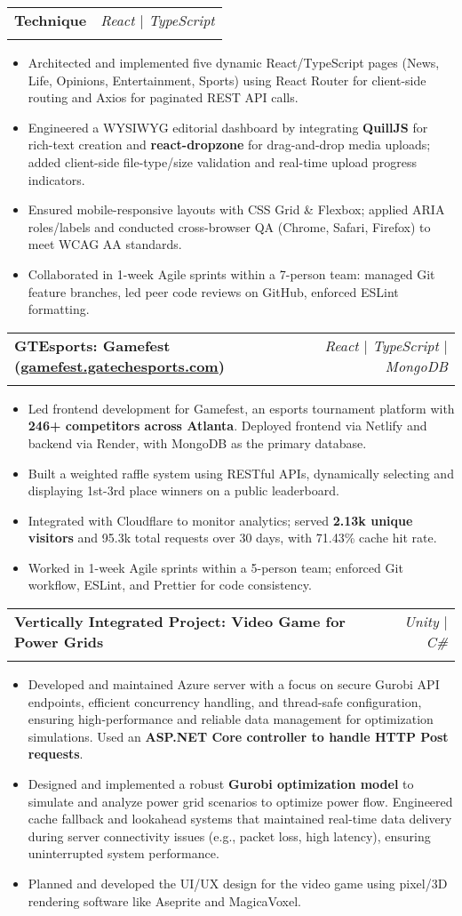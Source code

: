 \documentclass[letterpaper,11pt]{article}
\makeatletter
\newcommand{\resumeItem}[1]{
  \item\small{
    {#1 \vspace{-2pt}}
  }
}
\newcommand{\resumeSubheading}[4]{
  \vspace{-2pt}\item
    \begin{tabular*}{0.97\textwidth}[t]{l@{\extracolsep{\fill}}r}
      \textbf{#1} & #2 \\
      \textit{\small#3} & \textit{\small #4} \\
    \end{tabular*}\vspace{-7pt}
}
\newcommand{\resumeItemListStart}{\begin{itemize}}
\newcommand{\resumeItemListEnd}{\end{itemize}\vspace{-8pt}}
\makeatother
\begin{document}
    \resumeSubheading
    {Technique}{\textit{React $|$ TypeScript}}
    {}{}
    \resumeItemListStart
    \vspace{-5mm}
      \resumeItem{Architected and implemented five dynamic React/TypeScript pages (News, Life, Opinions, Entertainment, Sports) using React Router for client-side routing and Axios for paginated REST API calls.}
      \resumeItem{Engineered a WYSIWYG editorial dashboard by integrating \textbf{QuillJS} for rich-text creation and \textbf{react-dropzone} for drag-and-drop media uploads; added client-side file-type/size validation and real-time upload progress indicators.}
      \resumeItem{Ensured mobile-responsive layouts with CSS Grid \& Flexbox; applied ARIA roles/labels and conducted cross-browser QA (Chrome, Safari, Firefox) to meet WCAG AA standards.}
      \resumeItem{Collaborated in 1-week Agile sprints within a 7-person team: managed Git feature branches, led peer code reviews on GitHub, enforced ESLint formatting.}
    \resumeItemListEnd

    \resumeSubheading
    {GTEsports: Gamefest (\href{https://gamefest.gatechesports.com/home}{\underline{gamefest.gatechesports.com}})}{\textit{React $|$ TypeScript $|$ MongoDB}}
    {}{}
    \resumeItemListStart
    \vspace{-5mm}
      \resumeItem{Led frontend development for Gamefest, an esports tournament platform with \textbf{246+ competitors across Atlanta}. Deployed frontend via Netlify and backend via Render, with MongoDB as the primary database.}
      \resumeItem{Built a weighted raffle system using RESTful APIs, dynamically selecting and displaying 1st-3rd place winners on a public leaderboard.}
      \resumeItem{Integrated with Cloudflare to monitor analytics; served \textbf{2.13k unique visitors} and 95.3k total requests over 30 days, with 71.43\% cache hit rate.}
      \resumeItem{Worked in 1-week Agile sprints within a 5-person team; enforced Git workflow, ESLint, and Prettier for code consistency.}
    \resumeItemListEnd    

    \resumeSubheading
      {Vertically Integrated Project: Video Game for Power Grids}{\textit{Unity $|$ C\#}}
      {}{}
      \resumeItemListStart
      \vspace{-5mm}
        \resumeItem{Developed and maintained Azure server with a focus on secure Gurobi API endpoints, efficient concurrency handling, and thread-safe configuration, ensuring high-performance and reliable data management for optimization simulations. Used an \textbf{ASP.NET Core controller to handle HTTP Post requests}.}
        \resumeItem{Designed and implemented a robust \textbf{Gurobi optimization model} to simulate and analyze power grid scenarios to optimize power flow. Engineered cache fallback and lookahead systems that maintained real-time data delivery during server connectivity issues (e.g., packet loss, high latency), ensuring uninterrupted system performance.}
        \resumeItem{Planned and developed the UI/UX design for the video game using pixel/3D rendering software like Aseprite and MagicaVoxel.} 
    \resumeItemListEnd
    
\end{document}
